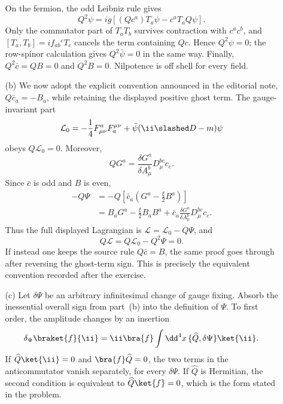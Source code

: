 \begin{enumerate}
\begin{enumerate}
      On the fermion, the odd Leibniz rule gives
      \[
        Q^2\psi=ig\left[(Qc^a)T_a\psi-c^aT_aQ\psi\right].
      \]
      Only the commutator part of \(T_aT_b\) survives contraction with
      \(c^ac^b\), and
      \([T_a,T_b]=if_{ab}{}^cT_c\) cancels the term containing \(Qc\).
      Hence \(Q^2\psi=0\); the row-spinor calculation gives
      \(Q^2\bar\psi=0\) in the same way.  Finally,
      \(Q^2\bar c=QB=0\) and \(Q^2B=0\).  Nilpotence is off shell for every
      field.

    \item[(b)] We now adopt the explicit convention announced in the
      editorial note, \(Q\bar c_a=-B_a\), while retaining the displayed
      positive ghost term.  The gauge-invariant part
      \[
        \mathcal L_0=-\frac14F^a_{\mu\nu}F_a^{\mu\nu}
          +\bar\psi(\ii\slashed D-m)\psi
      \]
      obeys \(Q\mathcal L_0=0\).  Moreover,
      \[
        QG^a=\frac{\delta G^a}{\delta A_\mu^b}
          D_\mu^{bc}c_c.
      \]
      Since \(\bar c\) is odd and \(B\) is even,
      \[
        \begin{split}
        -Q\Psi
          &=-Q\!\left[\bar c_a
             \left(G^a-\frac\xi2B^a\right)\right]\\
          &=B_aG^a-\frac\xi2B_aB^a
            +\bar c_a\frac{\delta G^a}{\delta A_\mu^b}
              D_\mu^{bc}c_c.
        \end{split}
      \]
      Thus the full displayed Lagrangian is
      \(\mathcal L=\mathcal L_0-Q\Psi\), and
      \[
        Q\mathcal L=Q\mathcal L_0-Q^2\Psi=0.
      \]
      If instead one keeps the source rule \(Q\bar c=B\), the same proof
      goes through after reversing the ghost-term sign.  This is precisely
      the equivalent convention recorded after the exercise.

    \item[(c)] Let \(\delta\Psi\) be an arbitrary infinitesimal change of
      gauge fixing.  Absorb the inessential overall sign from part~(b) into
      the definition of \(\Psi\).  To first order, the amplitude changes by
      an insertion
      \[
        \delta_\Psi\braket{f}{\ii}
          =\ii\bra{f}
             \int \dd^4x\,\{\widehat Q,\delta\Psi\}
            \ket{\ii} .
      \]
      If
      \(\widehat Q\ket{\ii}=0\) and
      \(\bra{f}\widehat Q=0\), the two terms in the anticommutator
      vanish separately, for every \(\delta\Psi\).  If
      \(\widehat Q\) is Hermitian, the second condition is equivalent to
      \(\widehat Q\ket{f}=0\), which is the form stated in the problem.


\end{enumerate}
\end{enumerate}

